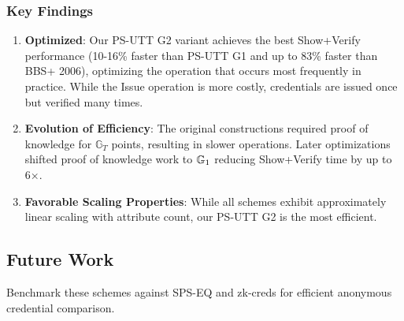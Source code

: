 \subsubsection{Key Findings}
\begin{enumerate}
    \item \textbf{Optimized}: Our PS-UTT G2 variant achieves the best Show+Verify performance (10-16\% faster than PS-UTT G1 and up to 83\% faster than BBS+ 2006), optimizing the operation that occurs most frequently in practice. While the Issue operation is more costly, credentials are issued once but verified many times.
    
    \item \textbf{Evolution of Efficiency}: The original constructions \cite{hutchison_constant-size_2006, sako_short_2016} required proof of knowledge for $\mathbb{G}_T$ points, resulting in slower operations. Later optimizations \cite{camenisch_anonymous_2016, tomescu_utt_2022} shifted proof of knowledge work to $\mathbb{G}_1$ reducing Show+Verify time by up to 6×.
    
    \item \textbf{Favorable Scaling Properties}: While all schemes exhibit approximately linear scaling with attribute count, our PS-UTT G2 is the most efficient.
\end{enumerate}




\subsection{Future Work}
Benchmark these schemes against SPS-EQ and zk-creds for efficient anonymous credential comparison.






